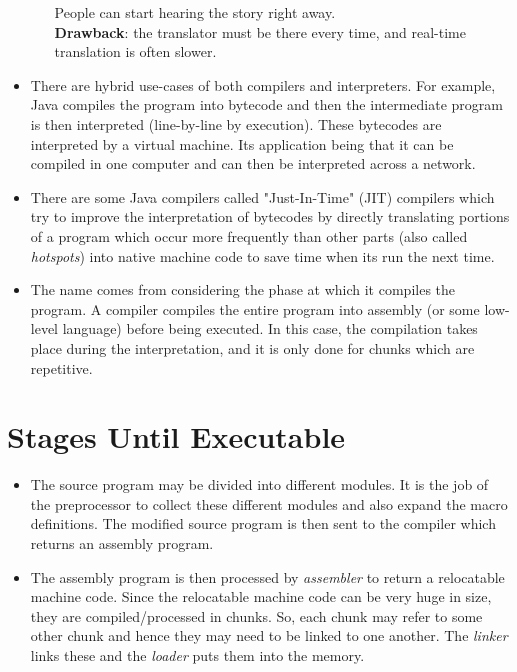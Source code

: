\documentclass[hidelinks]{article}
\begin{document}
\begin{itemize}
\begin{itemize}
        People can start hearing the story right away. \\

        \textbf{Drawback}: the translator must be there every time, and real-time translation is often slower.
    \end{itemize}

    \item There are hybrid use-cases of both compilers and interpreters. For example, Java compiles the program into bytecode and then the intermediate program is then interpreted (line-by-line by execution). These bytecodes are interpreted by a virtual machine. Its application being that it can be compiled in one computer and can then be interpreted across a network.

    \item There are some Java compilers called "Just-In-Time" (JIT) compilers which try to improve the interpretation of bytecodes by directly translating portions of a program which occur more frequently than other parts (also called \textit{hotspots}) into native machine code to save time when its run the next time.

    \item The name comes from considering the phase at which it compiles the program. A compiler compiles the entire program into assembly (or some low-level language) before being executed. In this case, the compilation takes place during the interpretation, and it is only done for chunks which are repetitive.
\end{itemize}

\section{Stages Until Executable}

    \begin{itemize}
        
    \item The source program may be divided into different modules. It is the job of the preprocessor to collect these different modules and also expand the macro definitions. The modified source program is then sent to the compiler which returns an assembly program.

    \item The assembly program is then processed by \textit{assembler} to return a relocatable machine code. Since the relocatable machine code can be very huge in size, they are compiled/processed in chunks. So, each chunk may refer to some other chunk and hence they may need to be linked to one another. The \textit{linker} links these and the \textit{loader} puts them into the memory.
    \end{itemize}
\end{document}

